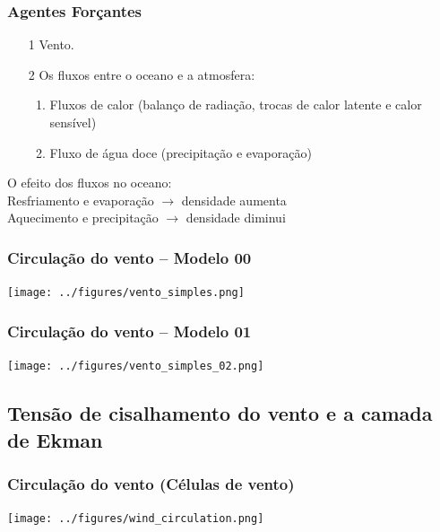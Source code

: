 \begin{frame}
  \frametitle{Agentes Forçantes}
  \begin{itemize}[<+-| alert@+>]
    \item[1] Vento.
    \item[2] Os fluxos entre o oceano e a atmosfera:
    \begin{enumerate}[<+-| alert@+>]
      \item Fluxos de calor (balanço de radiação, trocas de calor latente e
            calor sensível)
      \item Fluxo de água doce (precipitação e evaporação)
    \end{enumerate}
  \end{itemize}

  \pause
  \begin{block}{}
  O efeito dos fluxos no oceano:\\
  Resfriamento e evaporação $\rightarrow$ densidade aumenta\\
  Aquecimento e precipitação $\rightarrow$ densidade diminui
  \end{block}

\end{frame}


\begin{frame}
  \frametitle{Circulação do vento -- Modelo 00}
  \begin{center}
    \texttt{[image: ../figures/vento\_simples.png]}
  \end{center}
\end{frame}


\begin{frame}
  \frametitle{Circulação do vento -- Modelo 01}
  \begin{center}
    \texttt{[image: ../figures/vento\_simples\_02.png]}
  \end{center}
\end{frame}


\subsection{Tensão de cisalhamento do vento e a camada de Ekman}
\begin{frame}
  \frametitle{Circulação do vento (Células de vento)}
  \begin{center}
    \texttt{[image: ../figures/wind\_circulation.png]}
  \end{center}
\end{frame}


